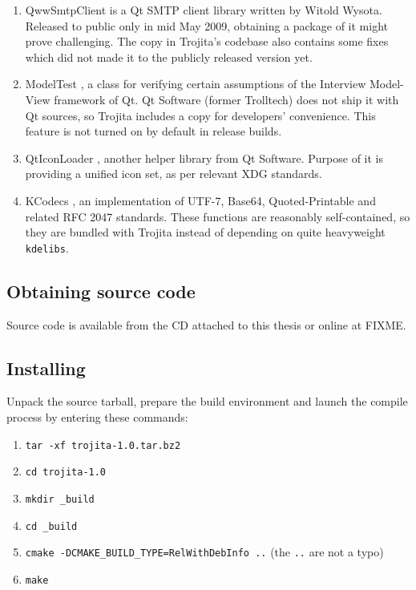 \documentclass[12pt,notitlepage]{report}
\newcommand{\trojita}{Trojita\xspace}
\begin{document}
\begin{enumerate}
    \item{QwwSmtpClient \cite{qwwsmtpclient} is a Qt SMTP client library written
        by Witold Wysota.  Released to public only in mid May 2009, obtaining a
        package of it might prove challenging.  The copy in \trojita's codebase
        also contains some fixes which did not made it to the publicly released
        version yet.}
    \item{ModelTest \cite{modeltest}, a class for verifying certain assumptions
        of the Interview Model-View framework of Qt.  Qt Software (former
        Trolltech) does not ship it with Qt sources, so \trojita includes a copy
        for developers' convenience.  This feature is not turned on by default
        in release builds.}
    \item{QtIconLoader \cite{qticonloader}, another helper library from Qt
        Software.  Purpose of it is providing a unified icon set, as per
        relevant XDG standards.}
    \item{KCodecs \cite{kcodecs}, an implementation of UTF-7, Base64,
        Quoted-Printable and related RFC 2047 standards.  These functions are
        reasonably self-contained, so they are bundled with \trojita instead of
        depending on quite heavyweight {\tt kdelibs}.}
\end{enumerate}

\subsection{Obtaining source code}

Source code is available from the CD attached to this thesis or online at FIXME.

\subsection{Installing}

Unpack the source tarball, prepare the build environment and launch the compile
process by entering these commands:

\begin{enumerate}
    \item{{\tt tar -xf trojita-1.0.tar.bz2}}
    \item{{\tt cd trojita-1.0}}
    \item{{\tt mkdir \_build}}
    \item{{\tt cd \_build}}
    \item{{\tt cmake -DCMAKE\_BUILD\_TYPE=RelWithDebInfo ..}} (the {\tt ..} are
        not a typo)
    \item{{\tt make}}
\end{enumerate}
\end{document}
